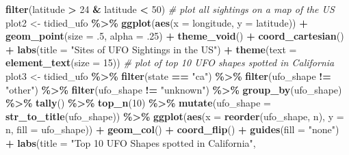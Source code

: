 \documentclass[
]{book}
\newenvironment{Shaded}{\begin{snugshade}}{\end{snugshade}}
\newcommand{\AttributeTok}[1]{\textcolor[rgb]{0.13,0.29,0.53}{#1}}
\newcommand{\CommentTok}[1]{\textcolor[rgb]{0.56,0.35,0.01}{\textit{#1}}}
\newcommand{\DecValTok}[1]{\textcolor[rgb]{0.00,0.00,0.81}{#1}}
\newcommand{\FunctionTok}[1]{\textcolor[rgb]{0.13,0.29,0.53}{\textbf{#1}}}
\newcommand{\NormalTok}[1]{#1}
\newcommand{\OtherTok}[1]{\textcolor[rgb]{0.56,0.35,0.01}{#1}}
\newcommand{\SpecialCharTok}[1]{\textcolor[rgb]{0.81,0.36,0.00}{\textbf{#1}}}
\newcommand{\StringTok}[1]{\textcolor[rgb]{0.31,0.60,0.02}{#1}}
\begin{document}
\begin{Shaded}
\begin{Highlighting}[]
  \FunctionTok{filter}\NormalTok{(latitude }\SpecialCharTok{\textgreater{}} \DecValTok{24} \SpecialCharTok{\&}\NormalTok{ latitude }\SpecialCharTok{\textless{}} \DecValTok{50}\NormalTok{)}
\CommentTok{\# plot all sightings on a map of the US}
\NormalTok{plot2 }\OtherTok{\textless{}{-}}\NormalTok{ tidied\_ufo }\SpecialCharTok{\%\textgreater{}\%}
  \FunctionTok{ggplot}\NormalTok{(}\FunctionTok{aes}\NormalTok{(}\AttributeTok{x =}\NormalTok{ longitude, }\AttributeTok{y =}\NormalTok{ latitude)) }\SpecialCharTok{+} 
  \FunctionTok{geom\_point}\NormalTok{(}\AttributeTok{size =}\NormalTok{ .}\DecValTok{5}\NormalTok{, }\AttributeTok{alpha =}\NormalTok{ .}\DecValTok{25}\NormalTok{) }\SpecialCharTok{+}
  \FunctionTok{theme\_void}\NormalTok{() }\SpecialCharTok{+}
  \FunctionTok{coord\_cartesian}\NormalTok{() }\SpecialCharTok{+}
  \FunctionTok{labs}\NormalTok{(}\AttributeTok{title =} \StringTok{"Sites of UFO Sightings in the US"}\NormalTok{) }\SpecialCharTok{+}
  \FunctionTok{theme}\NormalTok{(}\AttributeTok{text =} \FunctionTok{element\_text}\NormalTok{(}\AttributeTok{size =} \DecValTok{15}\NormalTok{))}
\CommentTok{\# plot of top 10 UFO shapes spotted in California}
\NormalTok{plot3 }\OtherTok{\textless{}{-}}\NormalTok{ tidied\_ufo }\SpecialCharTok{\%\textgreater{}\%}
  \FunctionTok{filter}\NormalTok{(state }\SpecialCharTok{==} \StringTok{"ca"}\NormalTok{) }\SpecialCharTok{\%\textgreater{}\%}
  \FunctionTok{filter}\NormalTok{(ufo\_shape }\SpecialCharTok{!=} \StringTok{"other"}\NormalTok{) }\SpecialCharTok{\%\textgreater{}\%}
  \FunctionTok{filter}\NormalTok{(ufo\_shape }\SpecialCharTok{!=} \StringTok{"unknown"}\NormalTok{) }\SpecialCharTok{\%\textgreater{}\%}
  \FunctionTok{group\_by}\NormalTok{(ufo\_shape) }\SpecialCharTok{\%\textgreater{}\%}
  \FunctionTok{tally}\NormalTok{() }\SpecialCharTok{\%\textgreater{}\%}
  \FunctionTok{top\_n}\NormalTok{(}\DecValTok{10}\NormalTok{) }\SpecialCharTok{\%\textgreater{}\%}
  \FunctionTok{mutate}\NormalTok{(}\AttributeTok{ufo\_shape =} \FunctionTok{str\_to\_title}\NormalTok{(ufo\_shape)) }\SpecialCharTok{\%\textgreater{}\%}
  \FunctionTok{ggplot}\NormalTok{(}\FunctionTok{aes}\NormalTok{(}\AttributeTok{x =} \FunctionTok{reorder}\NormalTok{(ufo\_shape, n), }\AttributeTok{y =}\NormalTok{ n, }\AttributeTok{fill =}\NormalTok{ ufo\_shape)) }\SpecialCharTok{+}
  \FunctionTok{geom\_col}\NormalTok{() }\SpecialCharTok{+} 
  \FunctionTok{coord\_flip}\NormalTok{() }\SpecialCharTok{+}
  \FunctionTok{guides}\NormalTok{(}\AttributeTok{fill =} \StringTok{"none"}\NormalTok{) }\SpecialCharTok{+} 
  \FunctionTok{labs}\NormalTok{(}\AttributeTok{title =} \StringTok{"Top 10 UFO Shapes spotted in California"}\NormalTok{,}

\end{Highlighting}
\end{Shaded}
\end{document}
